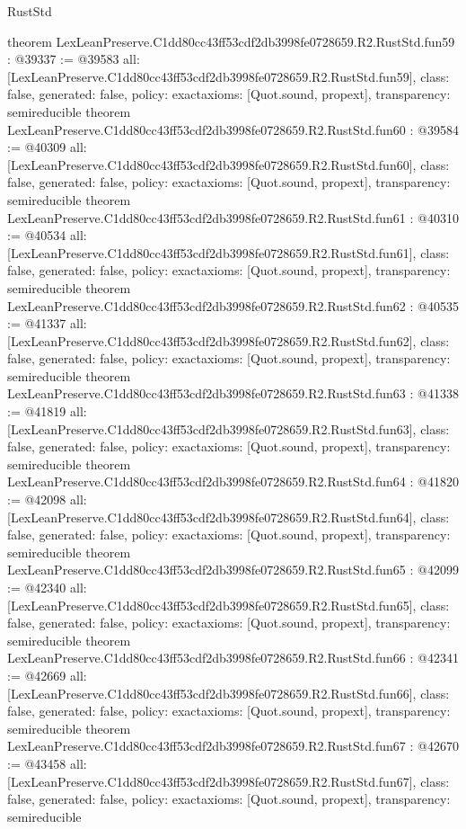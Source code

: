 \begin{lexlean}{RustStd}
\begin{coremodule}
{}
theorem LexLeanPreserve.C1dd80cc43ff53cdf2db3998fe0728659.R2.RustStd.fun59 : @39337 := @39583 {
  all: [LexLeanPreserve.C1dd80cc43ff53cdf2db3998fe0728659.R2.RustStd.fun59],
  class: false,
  generated: false,
  policy: exact{axioms: [Quot.sound, propext]},
  transparency: semireducible
}
theorem LexLeanPreserve.C1dd80cc43ff53cdf2db3998fe0728659.R2.RustStd.fun60 : @39584 := @40309 {
  all: [LexLeanPreserve.C1dd80cc43ff53cdf2db3998fe0728659.R2.RustStd.fun60],
  class: false,
  generated: false,
  policy: exact{axioms: [Quot.sound, propext]},
  transparency: semireducible
}
theorem LexLeanPreserve.C1dd80cc43ff53cdf2db3998fe0728659.R2.RustStd.fun61 : @40310 := @40534 {
  all: [LexLeanPreserve.C1dd80cc43ff53cdf2db3998fe0728659.R2.RustStd.fun61],
  class: false,
  generated: false,
  policy: exact{axioms: [Quot.sound, propext]},
  transparency: semireducible
}
theorem LexLeanPreserve.C1dd80cc43ff53cdf2db3998fe0728659.R2.RustStd.fun62 : @40535 := @41337 {
  all: [LexLeanPreserve.C1dd80cc43ff53cdf2db3998fe0728659.R2.RustStd.fun62],
  class: false,
  generated: false,
  policy: exact{axioms: [Quot.sound, propext]},
  transparency: semireducible
}
theorem LexLeanPreserve.C1dd80cc43ff53cdf2db3998fe0728659.R2.RustStd.fun63 : @41338 := @41819 {
  all: [LexLeanPreserve.C1dd80cc43ff53cdf2db3998fe0728659.R2.RustStd.fun63],
  class: false,
  generated: false,
  policy: exact{axioms: [Quot.sound, propext]},
  transparency: semireducible
}
theorem LexLeanPreserve.C1dd80cc43ff53cdf2db3998fe0728659.R2.RustStd.fun64 : @41820 := @42098 {
  all: [LexLeanPreserve.C1dd80cc43ff53cdf2db3998fe0728659.R2.RustStd.fun64],
  class: false,
  generated: false,
  policy: exact{axioms: [Quot.sound, propext]},
  transparency: semireducible
}
theorem LexLeanPreserve.C1dd80cc43ff53cdf2db3998fe0728659.R2.RustStd.fun65 : @42099 := @42340 {
  all: [LexLeanPreserve.C1dd80cc43ff53cdf2db3998fe0728659.R2.RustStd.fun65],
  class: false,
  generated: false,
  policy: exact{axioms: [Quot.sound, propext]},
  transparency: semireducible
}
theorem LexLeanPreserve.C1dd80cc43ff53cdf2db3998fe0728659.R2.RustStd.fun66 : @42341 := @42669 {
  all: [LexLeanPreserve.C1dd80cc43ff53cdf2db3998fe0728659.R2.RustStd.fun66],
  class: false,
  generated: false,
  policy: exact{axioms: [Quot.sound, propext]},
  transparency: semireducible
}
theorem LexLeanPreserve.C1dd80cc43ff53cdf2db3998fe0728659.R2.RustStd.fun67 : @42670 := @43458 {
  all: [LexLeanPreserve.C1dd80cc43ff53cdf2db3998fe0728659.R2.RustStd.fun67],
  class: false,
  generated: false,
  policy: exact{axioms: [Quot.sound, propext]},
  transparency: semireducible
}
\end{coremodule}
\end{lexlean}

